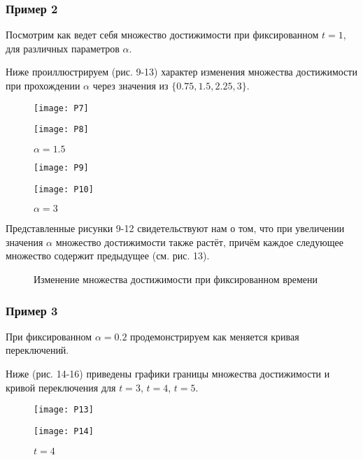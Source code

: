 \documentclass[a4paper,12pt]{article}
\begin{document}
\subsubsection{Пример 2}
Посмотрим как ведет себя множество достижимости при фиксированном $t = 1$, для различных параметров $\alpha$. 

Ниже проиллюстрируем (рис. 9-13) характер изменения множества достижимости при прохождении $ \alpha$ через значения из $\{0.75, 1.5, 2.25, 3\}$.
\begin{figure}[H]
\begin{minipage}[h]{0.49\linewidth}
\texttt{[image: P7]}
	\caption{$\alpha = 0.75$}
\end{minipage}
\hfill
\begin{minipage}[h]{0.49\linewidth}
\texttt{[image: P8]}
	\caption{$\alpha = 1.5$}
\end{minipage}
\end{figure}

\begin{figure}[H]
\begin{minipage}[h]{0.49\linewidth}
\texttt{[image: P9]}
	\caption{$\alpha = 2.25$}
\end{minipage}
\hfill
\begin{minipage}[h]{0.49\linewidth}
\texttt{[image: P10]}
	\caption{$\alpha = 3$}
\end{minipage}
\end{figure}

Представленные рисунки 9-12 свидетельствуют нам о том, что при увеличении значения $\alpha$ множество достижимости также растёт, причём каждое следующее множество содержит предыдущее (см. рис. 13).
\begin{figure}[H]
	\centering{\texttt{[image: P11]}}
	\caption{Изменение множества достижимости при фиксированном времени}
\end{figure}

\subsubsection{Пример 3}
При фиксированном $\alpha = 0.2$ продемонстрируем как меняется кривая переключений. 

Ниже (рис. 14-16) приведены графики границы множества достижимости и кривой переключения для $t = 3$, $t = 4$, $t = 5$.

\begin{figure}[H]
\begin{minipage}[h]{0.49\linewidth}
\texttt{[image: P13]}
	\caption{$ t = 3$}
\end{minipage}
\hfill
\begin{minipage}[h]{0.49\linewidth}
\texttt{[image: P14]}
	\caption{$t = 4$}
\end{minipage}
\end{figure}
\end{document}
